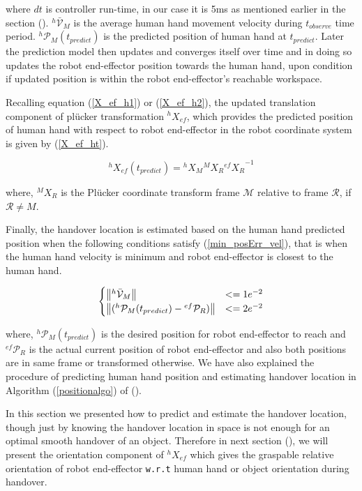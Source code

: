 where $dt$ is controller run-time, in our case it is 5ms as mentioned earlier in the section (). ${}^{h}\mathcal{\bar{V}}_{M}$ is the average human hand movement velocity during $t_{observe}$ time period. ${}^{h}\mathcal{P}_M(t_{predict})$ is the predicted position of human hand at $t_{predict}$. Later the prediction model then updates and converges itself over time and in doing so updates the robot end-effector position towards the human hand, upon condition if updated position is within the robot end-effector's reachable workspace. 

Recalling equation (\ref{X_ef_h1}) or (\ref{X_ef_h2}), the updated translation component of pl\"ucker transformation ${}^{h}{X}_{ef}$, which provides the predicted position of human hand with respect to robot end-effector in the robot coordinate system is given by (\ref{X_ef_ht}).

\begin{equation}\label{X_ef_ht}
{}^{h}{X}_{ef}(t_{predict}) =  {}^{h}{X}_M  {}^{M}{X}_R {{}^{ef}{X}_R}^{-1}
\end{equation}

where, ${}^{M}{X}_R$ is the Pl\"ucker coordinate transform frame $\mathcal{M}$ relative to frame $\mathcal{R}$, if $\mathcal R \neq M$.


Finally, the handover location is estimated based on the human hand predicted position when the following conditions satisfy (\ref{min_posErr_vel}), that is when the human hand velocity is minimum and robot end-effector is closest to the human hand.

\begin{equation}\label{min_posErr_vel}
\begin{cases}
	\norm{{}^{h}\mathcal{\bar{V}}_{M}}& <= 1e^{-2} \\
	\norm{({}^{h}\mathcal{P}_{M}(t_{predict}) - {}^{ef}\mathcal{P}_{R})} & <= 2e^{-2}
\end{cases}
\end{equation}

where, ${}^{h}\mathcal{P}_{M}(t_{predict})$ is the desired position for robot end-effector to reach and ${}^{ef}\mathcal{P}_{R}$ is the actual current position of robot end-effector and also both positions are in same frame or transformed otherwise. We have  also explained the procedure of predicting human hand position and estimating handover location in Algorithm (\ref{positionalgo}) of ().

In this section we presented how to predict and estimate the handover location, though just by knowing the handover location in space is not enough for an optimal smooth handover of an object. Therefore in next section (), we will present the orientation component of ${}^{h}{X}_{ef}$ which gives the graspable relative orientation of robot end-effector \texttt{w.r.t} human hand or object orientation during handover.


